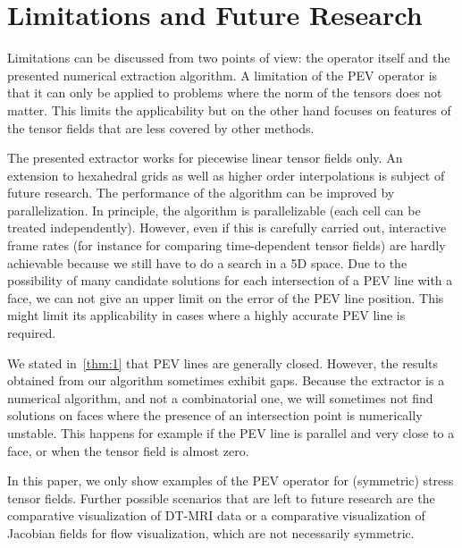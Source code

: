 
%
\section{Limitations and Future Research} %
\label{sec:pev_limitations}
% 
Limitations can be discussed from two points of view:
%
the operator itself and the presented numerical extraction algorithm.
%
A limitation of the \ac{PEV} operator is that it can only be applied to problems
where the norm of the tensors does not matter.
%
This limits the applicability but on the other hand focuses on features of the
tensor fields that are less covered by other methods.
%

%
The presented extractor works for piecewise linear tensor fields only.
%
An extension to hexahedral grids as well as higher order interpolations is
subject of future research.
%
The performance of the algorithm can be improved by parallelization.
%
In principle, the algorithm is parallelizable (each cell can be treated
independently).
%
However, even if this is carefully carried out, interactive frame rates (for
instance for comparing time-dependent tensor fields) are hardly achievable
because we still have to do a search in a \ac{5D} space.
%
Due to the possibility of many candidate solutions for each intersection of a
\ac{PEV} line with a face, we can not give an upper limit on the error of the
\ac{PEV} line position.
%
This might limit its applicability in cases where a highly accurate \ac{PEV} line is
required.
%

%
%
We stated in~\autoref{thm:1} that \ac{PEV} lines are generally closed.
%
However, the results obtained from our algorithm sometimes exhibit gaps.
%
Because the extractor is a numerical algorithm, and not a combinatorial one, we
will sometimes not find solutions on faces where the presence of an intersection
point is numerically unstable.
%
This happens for example if the \ac{PEV} line is parallel and very close to a face,
or when the tensor field is almost zero.
%
%

%
In this paper, we only show examples of the \ac{PEV} operator for (symmetric) stress
tensor fields.
%
Further possible scenarios that are left to future research are the comparative
visualization of DT-MRI data or a comparative visualization of Jacobian fields
for flow visualization, which are not necessarily symmetric.
%